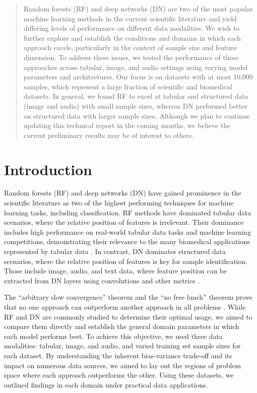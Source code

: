 \begin{abstract}
Random forests (RF) and deep networks (DN) are two of the most popular machine learning methods in the current scientific literature and yield differing levels of performance on different data modalities. We wish to further explore and establish the conditions and domains in which each approach excels, particularly in the context of sample size and feature dimension. To address these issues, we tested the performance of these approaches across tabular, image, and audio settings using varying model parameters and architectures.
Our focus is on datasets with at most 10,000 samples, which represent a large fraction of scientific and biomedical datasets.
In general, we found RF to excel at tabular and structured data (image and audio) with small sample sizes, whereas DN performed better on structured data with larger sample sizes. Although we plan to continue updating this technical report in the coming months, we believe the current preliminary results may be of interest to others.
\end{abstract}

\section{Introduction}
Random forests (RF) and deep networks (DN) have gained prominence in the scientific literature as two of the highest performing techniques for machine learning tasks, including classification. RF methods have dominated tabular data scenarios, where the relative position of features is irrelevant. Their dominance includes high performance on real-world tabular data tasks and machine learning competitions, demonstrating their relevance to the many biomedical applications represented by tabular data \citep{Wager2017-qk, microarray, spectral, svetnik}. In contrast, DN dominates structured data scenarios, where the relative position of features is key for sample identification. Those include image, audio, and text data, where feature position can be extracted from DN layers using convolutions and other metrics \citep{Krizhevsky2012-sq, Zhang2020-vg, Brown2020-tz, resnet}.

The ``arbitrary slow convergence'' theorem and the ``no free lunch'' theorem prove that no one approach can outperform another approach in all problems \citep{slow_conv, lunch}. While RF and DN are commonly studied to determine their optimal usage, we aimed to compare them directly and establish the general domain parameters in which each model performs best. To achieve this objective, we used three data modalities: tabular, image, and audio, and varied training set sample sizes for each dataset.
By understanding the inherent bias-variance trade-off and its impact on numerous data sources, we aimed to lay out the regions of problem space where each approach outperforms the other.
Using these datasets, we outlined findings in each domain under practical data applications.

